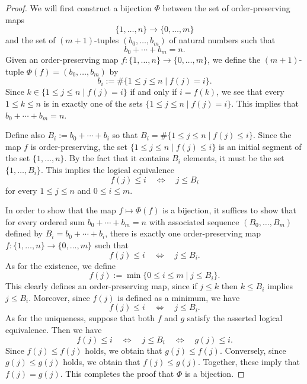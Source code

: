 \begin{proof}
  We will first construct a bijection $\Phi$ between the set of order-preserving maps
  \begin{equation*}
    \{1,\ldots,n\}\to\{0,\ldots,m\}
  \end{equation*}
  and the set of $(m+1)$-tuples $(b_0,\ldots,b_m)$ of natural numbers such that
  \begin{equation*}
    b_0+\cdots+b_m=n.
  \end{equation*}
  Given an order-preserving map $f:\{1,\ldots,n\}\to\{0,\ldots,m\}$, we define the $(m+1)$-tuple $\Phi(f)=(b_0,\ldots,b_m)$ by
  \begin{equation*}
    b_i:=\#\{1\leq j\leq n\mid f(j)=i\}. 
  \end{equation*}
  Since $k\in\{1\leq j\leq n\mid f(j)=i\}$ if and only if $i=f(k)$, we see that every $1\leq k\leq n$ is in exactly one of the sets $\{1\leq j\leq n\mid f(j)=i\}$. This implies that $b_0+\cdots+b_m=n$.

  Define also $B_i:=b_0+\cdots+b_i$ so that $B_i=\#\{1\leq j\leq n\mid f(j)\leq i\}$. Since the map $f$ is order-preserving, the set $\{1\leq j\leq n\mid f(j)\leq i\}$ is an initial segment of the set $\{1,\ldots,n\}$. By the fact that it contains $B_i$ elements, it must be the set $\{1,\ldots,B_i\}$. This implies the logical equivalence
  \begin{equation*}
    f(j)\leq i\quad\Leftrightarrow\quad j\leq B_i
  \end{equation*}
  for every $1\leq j\leq n$ and $0\leq i\leq m$.

  In order to show that the map $f\mapsto \Phi(f)$ is a bijection, it suffices to show that for every ordered sum $b_0+\cdots+b_m=n$ with associated sequence $(B_0,\ldots,B_m)$ defined by $B_i=b_0+\cdots+b_i$, there is exactly one order-preserving map $f:\{1,\ldots,n\}\to\{0,\ldots,m\}$ such that 
  \begin{equation*}
    f(j)\leq i\quad\Leftrightarrow\quad j\leq B_i.
  \end{equation*}
  As for the existence, we define
  \begin{equation*}
    f(j):=\min\{0\leq i\leq m\mid j\leq B_i\}.
  \end{equation*}
  This clearly defines an order-preserving map, since if $j\leq k$ then $k\leq B_i$ implies $j\leq B_i$. Moreover, since $f(j)$ is defined as a minimum, we have
  \begin{equation*}
    f(j)\leq i\quad\Leftrightarrow\quad j\leq B_i.
  \end{equation*}
  As for the uniqueness, suppose that both $f$ and $g$ satisfy the asserted logical equivalence. Then we have
  \begin{equation*}
    f(j) \leq i \quad\Leftrightarrow\quad j\leq B_i \quad\Leftrightarrow\quad g(j)\leq i.
  \end{equation*}
  Since $f(j)\leq f(j)$ holds, we obtain that $g(j)\leq f(j)$. Conversely, since $g(j)\leq g(j)$ holds, we obtain that $f(j)\leq g(j)$. Together, these imply that $f(j)=g(j)$. This completes the proof that $\Phi$ is a bijection.


\end{proof}
